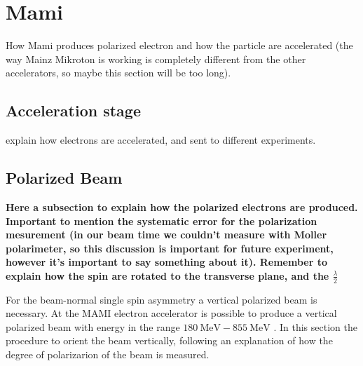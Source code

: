 \begin{figure}[hbtp]
\centering
{} \quad
{} \quad
\end{figure}


\section{Mami}
How Mami produces polarized electron and how the particle are accelerated (the way Mainz Mikroton is working is completely different from the other accelerators, so maybe this section will be too long).

\subsection{Acceleration stage}
explain how electrons are accelerated, and sent to different experiments.

\subsection{Polarized Beam}
{\bfseries Here a subsection to explain how the polarized electrons are produced. Important to mention the systematic error for the polarization mesurement (in our beam time we couldn't measure with Moller polarimeter, so this discussion is important for future experiment, however it's important to say something about it). Remember to explain how the spin are rotated to the transverse plane, and the $\frac{\lambda}{2}$}

For the beam-normal single spin asymmetry a vertical polarized beam is necessary. At the MAMI electron accelerator is possible to produce a vertical polarized beam with energy in the range $\SI{180}{\mega \electronvolt} - \SI{855}{\mega \electronvolt}$ \cite{VerticalMami}. In this section the procedure to orient the beam vertically, following an explanation of how the degree of polarizarion of the beam is measured.

